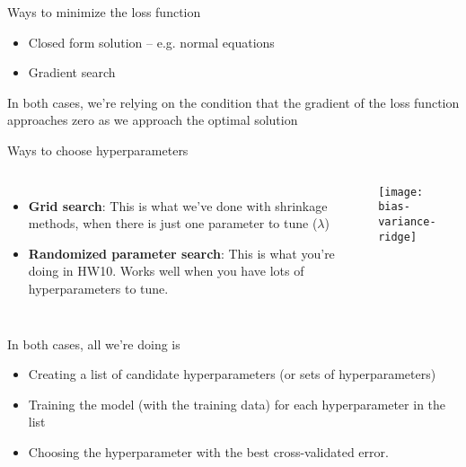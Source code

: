 \documentclass[mathserif, aspectratio=169]{beamer}
\begin{document}
\begin{frame}{Ways to minimize the loss function}
	\begin{itemize}
		\item Closed form solution -- e.g. normal equations
		\item Gradient search
	\end{itemize}


	In both cases, we're relying on the condition that the gradient of the loss function approaches zero as we approach the optimal solution 
\end{frame}


\begin{frame}{Ways to choose hyperparameters}
	\begin{columns}
			\begin{itemize}
				\item \textbf{Grid search}: This is what we've done with shrinkage methods, when there is just one parameter to tune ($\lambda$)
				\item \textbf{Randomized parameter search}: This is what you're doing in HW10.  Works well when you have lots of hyperparameters to tune.
			\end{itemize}
			\texttt{[image: bias-variance-ridge]}
	\end{columns}
	In both cases, all we're doing is 
	\begin{itemize}
		\item Creating a list of candidate hyperparameters (or sets of hyperparameters)
		\item Training the model (with the training data) for each hyperparameter in the list
		\item Choosing the hyperparameter with the best cross-validated error.
	\end{itemize}
\end{frame}
\end{document}
